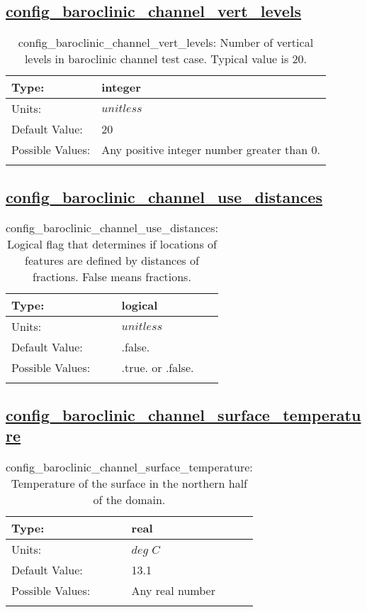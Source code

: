 \subsection[config\_baroclinic\_channel\_vert\_levels]{\hyperref[sec:nm_tab_baroclinic_channel]{config\_baroclinic\_channel\_vert\_levels}}
\label{subsec:nm_sec_config_baroclinic_channel_vert_levels}
\begin{center}
\begin{longtable}{| p{2.0in} || p{4.0in} |}
    \hline
    Type: & integer \\
    \hline
    Units: & $unitless$ \\
    \hline
    Default Value: & 20 \\
    \hline
    Possible Values: & Any positive integer number greater than 0. \\
    \hline
    \caption{config\_baroclinic\_channel\_vert\_levels: Number of vertical levels in baroclinic channel test case. Typical value is 20.}
\end{longtable}
\end{center}
\subsection[config\_baroclinic\_channel\_use\_distances]{\hyperref[sec:nm_tab_baroclinic_channel]{config\_baroclinic\_channel\_use\_distances}}
\label{subsec:nm_sec_config_baroclinic_channel_use_distances}
\begin{center}
\begin{longtable}{| p{2.0in} || p{4.0in} |}
    \hline
    Type: & logical \\
    \hline
    Units: & $unitless$ \\
    \hline
    Default Value: & .false. \\
    \hline
    Possible Values: & .true. or .false. \\
    \hline
    \caption{config\_baroclinic\_channel\_use\_distances: Logical flag that determines if locations of features are defined by distances of fractions. False means fractions.}
\end{longtable}
\end{center}
\subsection[config\_baroclinic\_channel\_surface\_temperature]{\hyperref[sec:nm_tab_baroclinic_channel]{config\_baroclinic\_channel\_surface\_temperature}}
\label{subsec:nm_sec_config_baroclinic_channel_surface_temperature}
\begin{center}
\begin{longtable}{| p{2.0in} || p{4.0in} |}
    \hline
    Type: & real \\
    \hline
    Units: & $deg$ $C$ \\
    \hline
    Default Value: & 13.1 \\
    \hline
    Possible Values: & Any real number \\
    \hline
    \caption{config\_baroclinic\_channel\_surface\_temperature: Temperature of the surface in the northern half of the domain.}
\end{longtable}
\end{center}
